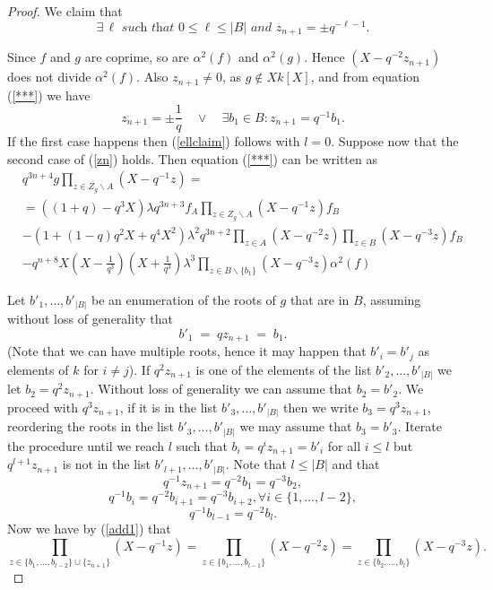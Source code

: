 \documentclass[10pt,a4paper]{amsart}
\begin{document}
\begin{proof}
\noindent We claim that 
\begin{equation}\label{ellclaim} \exists \, \ell \textit{ such that } 0\leq \ell \leq |B| \textit{ and } z_{n+1}=\pm q^{-\ell -1}.
\end{equation}

Since $f$ and $g$ are coprime, so are $\alpha^2(f)$ and $\alpha^2(g)$.  Hence $(X-q^{-2}z_{n+1})$ does not divide $\alpha^2(f)$. Also $z_{n+1}\neq 0$, as $g\notin Xk[X]$,  and from equation (\ref{***}) we have
\begin{equation}\label{zn}z_{n+1}=\pm \frac{1}{q}\quad \vee\quad \exists b_1\in B: z_{n+1}=q^{-1}b_1. \end{equation}
If the first case happens then (\ref{ellclaim}) follows with $l=0$. Suppose now that the second case of (\ref{zn}) holds. Then equation (\ref{***}) can be written as
\begin{equation}\label{simp_1}
\begin{split}
&q^{3n+4}g \prod_{z\in Z_g\backslash A}(X-q^{-1}z)=\\
&=\left((1+q)-q^3X\right)\lambda q^{3n+3}f_A\prod_{z\in Z_g\backslash A}(X-q^{-1}z)f_B\\
&-\left(1+(1-q)q^2X+q^4X^2\right)\lambda^2q^{3n+2}\prod_{z\in A}(X-q^{-2}z)\prod_{z\in B}(X-q^{-3}z)f_B\\
&-q^{n+8}X(X-\frac{1}{q^3})(X+\frac{1}{q^3})\lambda^3\prod_{z\in B\backslash\{b_1\}}(X-q^{-3}z)\alpha^2(f)
\end{split}
\end{equation}

Let $b'_1,\ldots,b'_{|B|}$ be an enumeration of the roots of $g$ that are in $B$, assuming without loss of generality that 
\begin{equation}\label{add1} b'_1 \; = \; qz_{n+1} \;= \; b_1.
\end{equation}
(Note that we can have multiple roots, hence it may happen that $b'_i=b'_j$ as elements of $k$ for $i\neq j$). If $q^2z_{n+1}$ is one of the elements of the list $b'_2,\ldots, b'_{|B|}$ we let $b_2=q^2z_{n+1}$. Without loss of generality we can assume that $b_2=b'_2$. We proceed with $q^3z_{n+1}$, if it is in the list $b'_3,\ldots,b'_{|B|}$ then we write $b_3=q^3z_{n+1}$, reordering the roots in the list $b'_3,\ldots,b'_{|B|}$ we may assume that $b_3=b'_3$. Iterate the procedure until we reach $l$ such that $b_i=q^{i}z_{n+1}=b'_i$ for all $i\leq l$ but $q^{l+1}z_{n+1}$ is not in the list $b'_{l+1},\ldots, b'_{|B|}$. Note that $l\leq |B|$ and that
$$q^{-1}z_{n+1}=q^{-2}b_1=q^{-3}b_2,$$
$$ q^{-1}b_i=q^{-2}b_{i+1}=q^{-3}b_{i+2}, \forall i\in\{1,\ldots, l-2\},$$
$$q^{-1}b_{l-1}=q^{-2}b_l.$$
Now we have by (\ref{add1}) that
$$\prod_{z\in\{b_1,\ldots,b_{l-2}\}\cup\{z_{n+1}\}}(X-q^{-1}z)=\prod_{z\in\{b_1,\ldots,b_{l-1}\}}(X-q^{-2}z)=\prod_{z\in\{b_2,\ldots,b_{l}\}}(X-q^{-3}z).$$


\end{proof}
\end{document}
